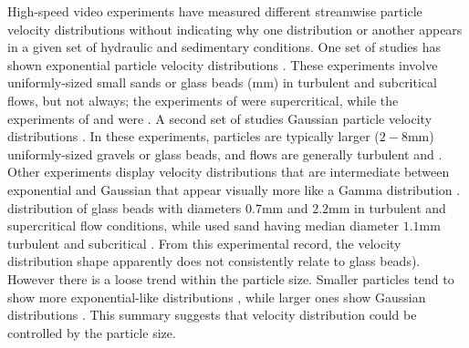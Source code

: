High-speed video experiments have measured different streamwise particle velocity distributions without indicating why one distribution or another appears in a given set of hydraulic and sedimentary conditions.
One set of studies has shown exponential particle velocity distributions \citep{Charru2004,Lajeunesse2010,Roseberry2012,Seizilles2014,Fathel2015,Fathel2016}.
These experiments involve uniformly-sized small sands or glass beads (\DIFdelbegin {}\DIFdelend \DIFaddbegin {}\DIFaddend mm) in turbulent and subcritical flows, but not always; the experiments of \citet{Lajeunesse2010} were \DIFaddbegin {}\DIFaddend supercritical, while the experiments of \citet{Charru2004} and \citet{Seizilles2014} were \DIFdelbegin {}\DIFdelend \DIFaddbegin {}\DIFaddend .
A second set of studies \DIFdelbegin {}\DIFdelend \DIFaddbegin {}\DIFaddend Gaussian particle velocity distributions \citep{Ancey2014,Heyman2016,Martin2012}. In these experiments, particles are typically larger ($2-8$mm) uniformly-sized gravels or glass beads, and flows are generally turbulent and \DIFdelbegin {}\DIFdelend \DIFaddbegin {}\DIFaddend .
Other experiments display velocity distributions that are intermediate between exponential and Gaussian \DIFdelbegin {}\DIFdelend that appear visually more like a Gamma distribution \citep{Houssais2012, Liu2019}.
\DIFdelbegin {}\DIFdelend \DIFaddbegin {}\DIFaddend distribution of glass beads with diameters $0.7$mm and $2.2$mm in turbulent and supercritical flow conditions, while \DIFdelbegin {}\DIFdelend \DIFaddbegin {}\DIFaddend used sand having median diameter $1.1$mm \DIFdelbegin {}\DIFdelend \DIFaddbegin {}\DIFaddend turbulent and subcritical \DIFaddbegin {}\DIFaddend .
From this experimental record, the velocity distribution shape apparently does not consistently relate to \DIFdelbegin {}\DIFdelend \DIFaddbegin {}\DIFaddend glass beads)\DIFdelbegin {}\DIFdelend .
However there is a loose trend within the particle size.
Smaller particles tend to show more exponential-like distributions \citep[e.g.][]{Fathel2015}, while larger ones show Gaussian distributions \citep[e.g.][]{Heyman2016}. This summary suggests that \DIFdelbegin {}\DIFdelend \DIFaddbegin {}\DIFaddend velocity distribution could be controlled by the particle size.

